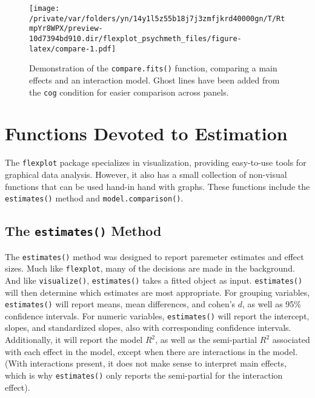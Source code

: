 \documentclass[
  english,
  man]{apa6}
\begin{document}
\begin{figure}
\centering
\texttt{[image: /private/var/folders/yn/14y1l5z55b18j7j3zmfjkrd40000gn/T/RtmpYr8WPX/preview-10d7394bd910.dir/flexplot\_psychmeth\_files/figure-latex/compare-1.pdf]}
\caption{\label{fig:compare}Demonstration of the \texttt{compare.fits()} function, comparing a main effects and an interaction model. Ghost lines have been added from the \texttt{cog} condition for easier comparison across panels. \label{fig:compare}}
\end{figure}

\normalsize

\hypertarget{functions-devoted-to-estimation}{%
\section{Functions Devoted to Estimation}\label{functions-devoted-to-estimation}}

The \texttt{flexplot} package specializes in visualization, providing easy-to-use tools for graphical data analysis. However, it also has a small collection of non-visual functions that can be used hand-in hand with graphs. These functions include the \texttt{estimates()} method and \texttt{model.comparison()}.

\hypertarget{the-estimates-method}{%
\subsection{\texorpdfstring{The \texttt{estimates()} Method}{The estimates() Method}}\label{the-estimates-method}}

The \texttt{estimates()} method was designed to report paremeter estimates and effect sizes. Much like \texttt{flexplot}, many of the decisions are made in the background. And like \texttt{visualize()}, \texttt{estimates()} takes a fitted object as input. \texttt{estimates()} will then determine which estimates are most appropriate. For grouping variables, \texttt{estimates()} will report means, mean differences, and cohen's \(d\), as well as 95\% confidence intervals. For numeric variables, \texttt{estimates()} will report the intercept, slopes, and standardized slopes, also with corresponding confidence intervals. Additionally, it will report the model \(R^2\), as well as the semi-partial \(R^2\) associated with each effect in the model, except when there are interactions in the model. (With interactions present, it does not make sense to interpret main effects, which is why \texttt{estimates()} only reports the semi-partial for the interaction effect).
\end{document}
